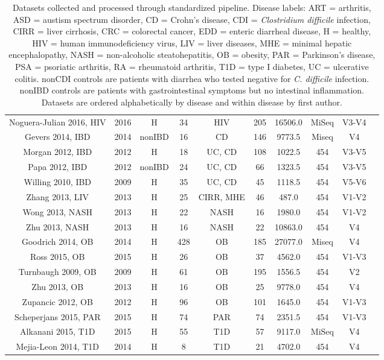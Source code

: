 {{\begin{table}[h]
{\begin{tabular}{c c c c c c c c c c}
	Noguera-Julian 2016, HIV & 2016 & H & 34 & HIV & 205 & 16506.0 & MiSeq & V3-V4 & \cite{noguera2016gut} \\
	Gevers 2014, IBD & 2014 & nonIBD & 16 & CD & 146 & 9773.5 & Miseq & V4 & \cite{ibd-gevers} \\
	Morgan 2012, IBD & 2012 & H & 18 & UC, CD & 108 & 1022.5 & 454 & V3-V5 & \cite{ibd-hut} \\
	Papa 2012, IBD & 2012 & nonIBD & 24 & UC, CD & 66 & 1323.5 & 454 & V3-V5 & \cite{ibd-papa} \\
	Willing 2010, IBD & 2009 & H & 35 & UC, CD & 45 & 1118.5 & 454 & V5-V6 & \cite{ibd-engstrand} \\
	Zhang 2013, LIV & 2013 & H & 25 & CIRR, MHE & 46 & 487.0 & 454 & V1-V2 & \cite{mhe-zhang} \\
	Wong 2013, NASH & 2013 & H & 22 & NASH & 16 & 1980.0 & 454 & V1-V2 & \cite{nash-chan} \\
	Zhu 2013, NASH & 2013 & H & 16 & NASH & 22 & 10863.0 & 454 & V4 & \cite{nash-baker} \\
	Goodrich 2014, OB & 2014 & H & 428 & OB & 185 & 27077.0 & Miseq & V4 & \cite{ob-goodrich} \\
	Ross 2015, OB & 2015 & H & 26 & OB & 37 & 4562.0 & 454 & V1-V3 & \cite{ob-ross} \\
	Turnbaugh 2009, OB & 2009 & H & 61 & OB & 195 & 1556.5 & 454 & V2 & \cite{ob-gordon} \\
	Zhu 2013, OB & 2013 & H & 16 & OB & 25 & 9778.0 & 454 & V4 & \cite{nash-baker} \\
	Zupancic 2012, OB & 2012 & H & 96 & OB & 101 & 1645.0 & 454 & V1-V3 & \cite{ob-zupancic} \\
	Scheperjans 2015, PAR & 2015 & H & 74 & PAR & 74 & 2351.5 & 454 & V1-V3 & \cite{par-schep} \\
	Alkanani 2015, T1D & 2015 & H & 55 & T1D & 57 & 9117.0 & MiSeq & V4 & \cite{t1d-alkanani} \\
	Mejia-Leon 2014, T1D & 2014 & H & 8 & T1D & 21 & 4702.0 & 454 & V4 & \cite{t1d-mejia} \\ 	\hline
\end{tabular}}
\caption{Datasets collected and processed through standardized pipeline. Disease labels: ART = arthritis, ASD = austism spectrum disorder, CD = Crohn's disease, CDI = \textit{Clostridium difficile} infection, CIRR = liver cirrhosis, CRC = colorectal cancer, EDD = enteric diarrheal disease, H = healthy, HIV = human immunodeficiency virus, LIV = liver diseases,  MHE =  minimal hepatic encephalopathy, NASH = non-alcoholic steatohepatitis, OB = obesity, PAR = Parkinson's disease, PSA = psoriatic arthritis, RA = rheumatoid arthritis, T1D = type I diabetes, UC = ulcerative colitis. nonCDI controls are patients with diarrhea who tested negative for \textit{C. difficile} infection. nonIBD controls are patients  with gastrointestinal symptoms but no intestinal inflammation. Datasets are ordered alphabetically by disease and within disease by first author.}\label{tab:datasets_full_info}
\end{table}
}

}
